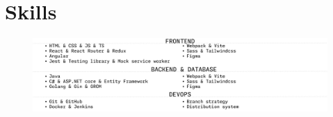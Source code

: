 \section{Skills}
\vspace{-20pt}
\begin{figure}[htbp]
    \includegraphics[width=\textwidth]{skills.png}
\end{figure}
\vspace{-20pt} 